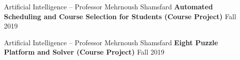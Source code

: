   \begin{cventries}

    \cventry
    {Artificial Intelligence -- Professor Mehrnoush Shamsfard}
    {\textbf {Automated Scheduling and Course Selection for Students (Course Project)}}
    {}
    {Fall 2019}
    {}
    \vspace{0.0 cm}
  \end{cventries}
  \begin{cventries}

    \cventry
    {Artificial Intelligence -- Professor Mehrnoush Shamsfard}
    {\textbf {Eight Puzzle Platform and Solver (Course Project)}}
    {}
    {Fall 2019}
    {}
    
\end{cventries}